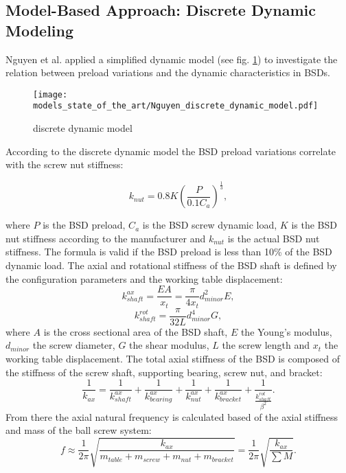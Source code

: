 \subsection{Model-Based Approach: Discrete Dynamic Modeling}
Nguyen et al. \cite{NGUYEN2019} applied a simplified dynamic model (see fig. \ref{fig:Nguyen_discrete_dynamic_model}) to investigate the relation between preload variations and the dynamic characteristics in BSDs.

\begin{figure}[H]
  \centering
  \texttt{[image: models\_state\_of\_the\_art/Nguyen\_discrete\_dynamic\_model.pdf]}
  \caption{discrete dynamic model \cite{NGUYEN2019}}
  \label{fig:Nguyen_discrete_dynamic_model}
\end{figure}

According to the discrete dynamic model the BSD preload variations correlate with the screw nut stiffness:

\begin{equation}
    k_{nut}=0.8K(\frac{P}{0.1C_{a}})^{\frac{1}{3}},
\end{equation}

where $P$ is the BSD preload, $C_{a}$ is the BSD screw dynamic load, $K$ is the BSD nut stiffness according to the manufacturer and $k_{nut}$ is the actual BSD nut stiffness. The formula is valid if the BSD preload is less than 10\% of the BSD dynamic load. The axial and rotational stiffness of the BSD shaft is defined by the configuration parameters and the working table displacement:
\begin{equation}
    k_{shaft}^{ax}=\frac{EA}{x_{t}}=\frac{\pi}{4x_{t}}d_{minor}^{2}E,
\end{equation}
\begin{equation}
    k_{shaft}^{rot}=\frac{\pi}{32L}d_{minor}^{4}G,
\end{equation}
 where $A$ is the cross sectional area of the BSD shaft, $E$ the Young’s modulus, $d_{minor}$ the screw diameter, $G$ the shear modulus, $L$ the screw length and $x_{t}$ the working table displacement. The total axial stiffness of the BSD is composed of the stiffness of the screw shaft, supporting bearing, screw nut, and bracket:
 \begin{equation}
    \frac{1}{k_{ax}}=\frac{1}{k_{shaft}^{ax}}+\frac{1}{k_{bearing}^{ax}}+\frac{1}{k_{nut}^{ax}}+\frac{1}{k_{bracket}^{ax}}+\frac{1}{\frac{k_{shaft}^{rot}}{\beta^{2}}}.
\end{equation}
From there the axial natural frequency is calculated based of the axial stiffness and mass of the ball screw system:
\begin{equation}
    f\approx\frac{1}{2\pi}\sqrt{\frac{k_{ax}}{m_{table}+m_{screw}+m_{nut}+m_{bracket}}}=\frac{1}{2\pi}\sqrt{\frac{k_{ax}}{\sum M}}.
\end{equation}

